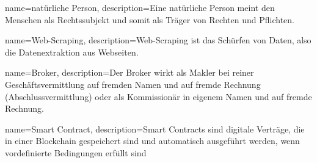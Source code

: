 {
name={natürliche Person},
description={\glqq Eine natürliche Person meint den Menschen als Rechtssubjekt und somit als Träger von Rechten und Pflichten.\grqq{} \cite{NatPerson_2018}}
}

{
name={Web-Scraping},
description={\glqq Web-Scraping ist das Schürfen von Daten, also die Datenextraktion aus Webseiten.\grqq{} \cite{webScraping_2021}}
}

{
name={Broker},
description={\glqq Der Broker wirkt als Makler bei reiner Geschäftsvermittlung auf fremden Namen und auf fremde Rechnung (Abschlussvermittlung) oder als Kommissionär in eigenem Namen und auf fremde Rechnung.\grqq{} \cite{broker_2018}}
}

{
name={Smart Contract},
description={\glqq Smart Contracts sind digitale Verträge, die in einer Blockchain gespeichert sind und automatisch ausgeführt werden, wenn vordefinierte Bedingungen erfüllt sind\grqq{} \cite{smartContract_2022}}
}





